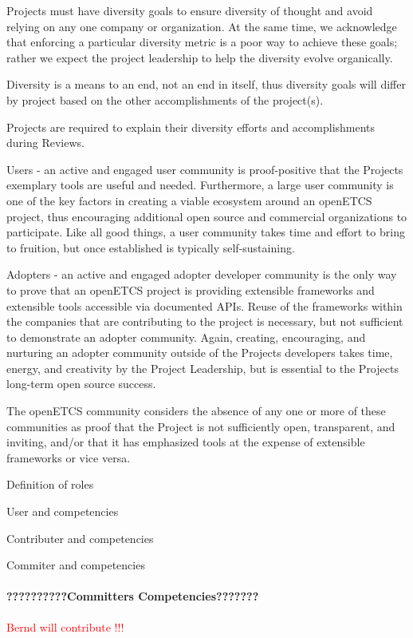 \documentclass{template/openetcs_article}
\begin{document}
Projects must have diversity goals to ensure diversity of thought and avoid relying on any one company or organization. At the same time, we acknowledge that enforcing a particular diversity metric is a poor way to achieve these goals; rather we expect the project leadership to help the diversity evolve organically.

Diversity is a means to an end, not an end in itself, thus diversity goals will differ by project based on the other accomplishments of the project(s).

Projects are required to explain their diversity efforts and accomplishments during Reviews.

Users - an active and engaged user community is proof-positive that the Project{\textquotesingle}s exemplary tools are useful and needed. Furthermore, a large user community is one of the key factors in creating a viable ecosystem around an openETCS project, thus encouraging additional open source and commercial organizations to participate. Like all good things, a user community takes time and effort to bring to fruition, but once established is typically self-sustaining.

Adopters - an active and engaged adopter developer community is the only way to prove that an openETCS project is providing extensible frameworks and extensible tools accessible via documented APIs. Reuse of the frameworks within the companies that are contributing to the project is necessary, but not sufficient to demonstrate an adopter community. Again, creating, encouraging, and nurturing an adopter community outside of the Project{\textquotesingle}s developers takes time, energy, and creativity by the Project Leadership, but is essential to the Project{\textquotesingle}s long-term open source success.

The openETCS community considers the absence of any one or more of these communities as proof that the Project is not sufficiently open, transparent, and inviting, and/or that it has emphasized tools at the expense of extensible frameworks or vice versa.



Definition of roles

User and competencies

Contributer and competencies

Commiter and competencies


\paragraph{??????????Committers Competencies???????}
\textcolor{red}{Bernd will contribute !!!}
\end{document}
